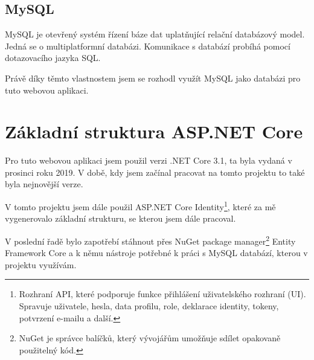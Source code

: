 \documentclass[a4paper, 12pt]{report}
\begin{document}
	\section{MySQL}
	MySQL je otevřený systém řízení báze dat uplatňující relační databázový model. Jedná se o multiplatformní databázi. Komunikace s databází probíhá pomocí dotazovacího jazyka SQL.\cite{MySQL_Wiki_CZ}\par
	Právě díky těmto vlastnostem jsem se rozhodl využít MySQL jako databázi pro tuto webovou aplikaci.

	\chapter{Základní struktura ASP.NET Core}
	Pro tuto webovou aplikaci jsem použil verzi .NET Core 3.1, ta byla vydaná v prosinci roku 2019. V době, kdy jsem začínal pracovat na tomto projektu to také byla nejnovější verze.\par
	V tomto projektu jsem dále použil ASP.NET Core Identity\footnote{Rozhraní API, které podporuje funkce přihlášení uživatelského rozhraní (UI). Spravuje uživatele, hesla, data profilu, role, deklarace identity, tokeny, potvrzení e-mailu a další.\cite{ASP.NET_Core_Identity}}, které za mě vygenerovalo základní strukturu, se kterou jsem dále pracoval.\par
	V poslední řadě bylo zapotřebí stáhnout přes NuGet package manager\footnote{NuGet je správce balíčků, který vývojářům umožňuje sdílet opakovaně použitelný kód.} Entity Framework Core a k němu nástroje potřebné k práci s MySQL databází, kterou v projektu využívám.
\end{document}
